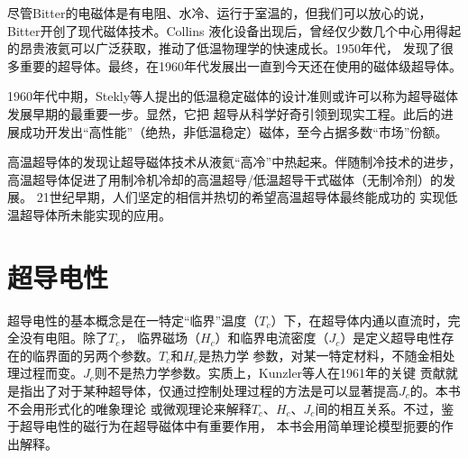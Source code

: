 \begin{table}[htbp]
\end{table}

尽管Bitter的电磁体是有电阻、水冷、运行于室温的，但我们可以放心的说，Bitter开创了现代磁体技术。Collins
液化设备出现后，曾经仅少数几个中心用得起的昂贵液氦可以广泛获取，推动了低温物理学的快速成长。1950年代，
发现了很多重要的超导体。最终，在1960年代发展出一直到今天还在使用的磁体级超导体。

1960年代中期，Stekly等人提出的低温稳定磁体的设计准则或许可以称为超导磁体发展早期的最重要一步。显然，它把
超导从科学好奇引领到现实工程。此后的进展成功开发出“高性能”（绝热，非低温稳定）磁体，至今占据多数“市场”份额。

高温超导体的发现让超导磁体技术从液氦“高冷”中热起来。伴随制冷技术的进步，高温超导体促进了用制冷机冷却的高温超导/低温超导干式磁体（无制冷剂）的发展。
21世纪早期，人们坚定的相信并热切的希望高温超导体最终能成功的
实现低温超导体所未能实现的应用。

\section{超导电性}
超导电性的基本概念是在一特定“临界”温度（$T_c$）下，在超导体内通以直流时，完全没有电阻。除了$T_c$，
临界磁场（$H_c$）和临界电流密度（$J_c$）是定义超导电性存在的临界面的另两个参数。$T_c$和$H_c$是热力学
参数，对某一特定材料，不随金相处理过程而变。$J_c$则不是热力学参数。实质上，Kunzler等人在1961年的关键
贡献就是指出了对于某种超导体，仅通过控制处理过程的方法是可以显著提高$J_c$的。本书不会用形式化的唯象理论
或微观理论来解释$T_c$、$H_c$、$J_c$间的相互关系。不过，鉴于超导电性的磁行为在超导磁体中有重要作用，
本书会用简单理论模型扼要的作出解释。

